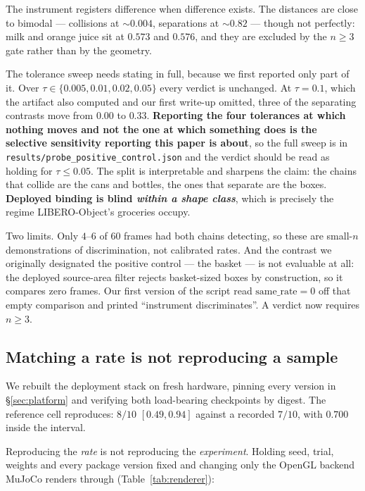\documentclass[10pt,twocolumn]{article}
\begin{document}
\noindent The instrument registers difference when difference exists. The
distances are close to bimodal --- collisions at ${\sim}0.004$, separations at
${\sim}0.82$ --- though not perfectly: milk and orange juice sit at $0.573$ and
$0.576$, and they are excluded by the $n \ge 3$ gate rather than by the
geometry.

The tolerance sweep needs stating in full, because we first reported only part
of it. Over $\tau \in \{0.005, 0.01, 0.02, 0.05\}$ every verdict is unchanged.
At $\tau = 0.1$, which the artifact also computed and our first write-up
omitted, three of the separating contrasts move from $0.00$ to $0.33$.
\textbf{Reporting the four tolerances at which nothing moves and not the one at
which something does is the selective sensitivity reporting this paper is
about}, so the full sweep is in
\texttt{results/probe\_positive\_control.json} and the verdict should be read
as holding for $\tau \le 0.05$. The split is
interpretable and sharpens the claim: the chains that collide are the cans and
bottles, the ones that separate are the boxes. \textbf{Deployed binding is blind
\emph{within a shape class}}, which is precisely the regime LIBERO-Object's
groceries occupy.

Two limits. Only $4$--$6$ of $60$ frames had both chains detecting, so these are
small-$n$ demonstrations of discrimination, not calibrated rates. And the
contrast we originally designated the positive control --- the basket --- is not
evaluable at all: the deployed source-area filter rejects basket-sized boxes by
construction, so it compares zero frames. Our first version of the script read
$\text{same\_rate}=0$ off that empty comparison and printed ``instrument
discriminates''. A verdict now requires $n \ge 3$.

\subsection{Matching a rate is not reproducing a sample}

We rebuilt the deployment stack on fresh hardware, pinning every version in
\S\ref{sec:platform} and verifying both load-bearing checkpoints by
digest. The reference cell reproduces: $8/10$ $[0.49,0.94]$ against a recorded
$7/10$, with $0.700$ inside the interval.

Reproducing the \emph{rate} is not reproducing the \emph{experiment}. Holding
seed, trial, weights and every package version fixed and changing only the
OpenGL backend MuJoCo renders through (Table~\ref{tab:renderer}):
\end{document}
